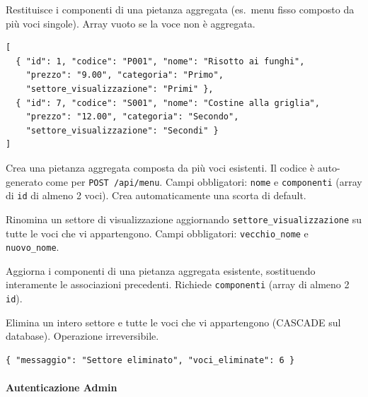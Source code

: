 Restituisce i componenti di una pietanza aggregata (es.\ menu fisso composto da
più voci singole). Array vuoto se la voce non è aggregata.

\begin{lstlisting}[style=json]
[
  { "id": 1, "codice": "P001", "nome": "Risotto ai funghi",
    "prezzo": "9.00", "categoria": "Primo",
    "settore_visualizzazione": "Primi" },
  { "id": 7, "codice": "S001", "nome": "Costine alla griglia",
    "prezzo": "12.00", "categoria": "Secondo",
    "settore_visualizzazione": "Secondi" }
]
\end{lstlisting}


Crea una pietanza aggregata composta da più voci esistenti. Il codice è
auto-generato come per \texttt{POST /api/menu}. Campi obbligatori:
\texttt{nome} e \texttt{componenti} (array di \texttt{id} di almeno 2 voci).
Crea automaticamente una scorta di default.



Rinomina un settore di visualizzazione aggiornando \texttt{settore\_visualizzazione}
su tutte le voci che vi appartengono. Campi obbligatori: \texttt{vecchio\_nome}
e \texttt{nuovo\_nome}.



Aggiorna i componenti di una pietanza aggregata esistente, sostituendo
interamente le associazioni precedenti. Richiede \texttt{componenti} (array
di almeno 2 \texttt{id}).



Elimina un intero settore e tutte le voci che vi appartengono (CASCADE sul
database). Operazione irreversibile.

\begin{lstlisting}[style=json]
{ "messaggio": "Settore eliminato", "voci_eliminate": 6 }
\end{lstlisting}

\paragraph{Autenticazione Admin}\mbox{}\\

